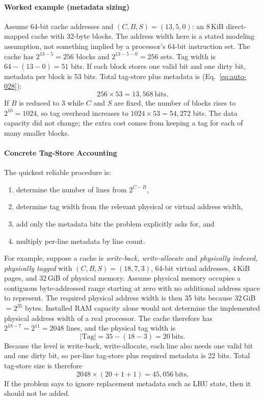 \paragraph{Worked example (metadata sizing)}\label{par:auto-017}
Assume 64-bit cache addresses and $(C,B,S)=(13,5,0)$: an 8\,KiB direct-mapped cache with 32-byte blocks.
The address width here is a stated modeling assumption, not something implied by a processor's 64-bit instruction set.
The cache has $2^{13-5}=256$ blocks and $2^{13-5-0}=256$ sets.
Tag width is $64-(13-0)=51$ bits.
If each block stores one valid bit and one dirty bit, metadata per block is 53 bits.
Total tag-store plus metadata is (Eq.~\eqref{eq:auto-028}):
\begin{equation}\label{eq:auto-028}
    256 \times 53 = 13{,}568\ \text{bits}.
\end{equation}
If $B$ is reduced to 3 while $C$ and $S$ are fixed, the number of blocks rises to $2^{10}=1024$, so tag overhead increases to $1024\times53=54{,}272$ bits.
The data capacity did not change; the extra cost comes from keeping a tag for each of many smaller blocks.

\paragraph{Concrete Tag-Store Accounting}\label{par:auto-017a}
The quickest reliable procedure is:
\begin{enumerate}
    \item determine the number of lines from $2^{C-B}$,
    \item determine tag width from the relevant physical or virtual address width,
    \item add only the metadata bits the problem explicitly asks for, and
    \item multiply per-line metadata by line count.
\end{enumerate}
For example, suppose a cache is \textit{write-back, write-allocate} and \textit{physically indexed, physically tagged} with $(C,B,S)=(18,7,3)$, 64-bit virtual addresses, 4\,KiB pages, and 32\,GiB of physical memory.
Assume physical memory occupies a contiguous byte-addressed range starting at zero with no additional address space to represent.
The required physical address width is then 35 bits because $32$\,GiB $=2^{35}$ bytes.
Installed RAM capacity alone would not determine the implemented physical address width of a real processor.
The cache therefore has $2^{18-7}=2^{11}=2048$ lines, and the physical tag width is
\begin{equation}\label{eq:auto-028a}
    |\text{Tag}| = 35-(18-3)=20\ \text{bits}.
\end{equation}
Because the level is write-back, write-allocate, each line also needs one valid bit and one dirty bit, so per-line tag-store plus required metadata is 22 bits.
Total tag-store size is therefore
\begin{equation}\label{eq:auto-028b}
    2048 \times (20+1+1)=45{,}056\ \text{bits}.
\end{equation}
If the problem says to ignore replacement metadata such as LRU state, then it should not be added.

